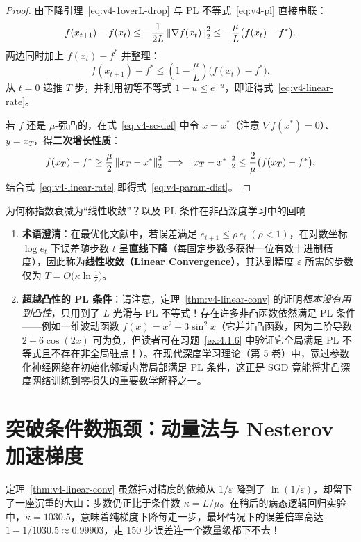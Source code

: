 \begin{proof}
由下降引理~\eqref{eq:v4-1overL-drop} 与 PL 不等式~\eqref{eq:v4-pl} 直接串联：
\[
  f(x_{t+1}) - f(x_t) \le -\frac{1}{2L}\left\|\nabla f(x_t)\right\|_2^2 \le -\frac{\mu}{L}\big(f(x_t) - f^*\big).
\]
两边同时加上 $f(x_t) - f^*$ 并整理：
\[
  f(x_{t+1}) - f^* \le \left(1 - \frac{\mu}{L}\right)\big(f(x_t) - f^*\big).
\]
从 $t=0$ 递推 $T$ 步，并利用初等不等式 $1 - u \le e^{-u}$，即证得式~\eqref{eq:v4-linear-rate}。

若 $f$ 还是 $\mu$-强凸的，在式~\eqref{eq:v4-sc-def} 中令 $x = x^*$（注意 $\nabla f(x^*)=0$）、$y = x_T$，得\textbf{二次增长性质}：
\[
  f(x_T) - f^* \ge \frac{\mu}{2}\left\|x_T - x^*\right\|_2^2 \implies \left\|x_T - x^*\right\|_2^2 \le \frac{2}{\mu}\big(f(x_T) - f^*\big),
\]
结合式~\eqref{eq:v4-linear-rate} 即得式~\eqref{eq:v4-param-dist}。
\end{proof}

\begin{insightBox}{为何称指数衰减为“线性收敛”？以及 PL 条件在非凸深度学习中的回响}
\begin{enumerate}
  \item \textbf{术语澄清}：在最优化文献中，若误差满足 $e_{t+1} \le \rho\, e_t\;(\rho < 1)$，在对数坐标 $\log e_t$ 下误差随步数 $t$ 呈\textbf{直线下降}（每固定步数多获得一位有效十进制精度），因此称为\textbf{线性收敛（Linear Convergence）}，其达到精度 $\varepsilon$ 所需的步数仅为 $T = O\big(\kappa \ln\frac{1}{\varepsilon}\big)$。
  \item \textbf{超越凸性的 PL 条件}：请注意，定理~\ref{thm:v4-linear-conv} 的证明\emph{根本没有用到凸性}，只用到了 $L$-光滑与 PL 不等式！存在许多非凸函数依然满足 PL 条件——例如一维波动函数 $f(x) = x^2 + 3\sin^2 x$（它并非凸函数，因为二阶导数 $2 + 6\cos(2x)$ 可为负，但读者可在习题~\ref{ex:4.1.6} 中验证它全局满足 PL 不等式且不存在非全局驻点！）。在现代深度学习理论（第 5 卷）中，宽过参数化神经网络在初始化邻域内常局部满足 PL 条件，这正是 SGD 竟能将非凸深度网络训练到零损失的重要数学解释之一。
\end{enumerate}
\end{insightBox}

\section{突破条件数瓶颈：动量法与 Nesterov 加速梯度}

定理~\ref{thm:v4-linear-conv} 虽然把对精度的依赖从 $1/\varepsilon$ 降到了 $\ln(1/\varepsilon)$，却留下了一座沉重的大山：步数仍正比于条件数 $\kappa = L/\mu$。在稍后的病态逻辑回归实验中，$\kappa = 1030.5$，意味着纯梯度下降每走一步，最坏情况下的误差倍率高达 $1 - 1/1030.5 \approx 0.99903$，走 150 步误差连一个数量级都下不去！

